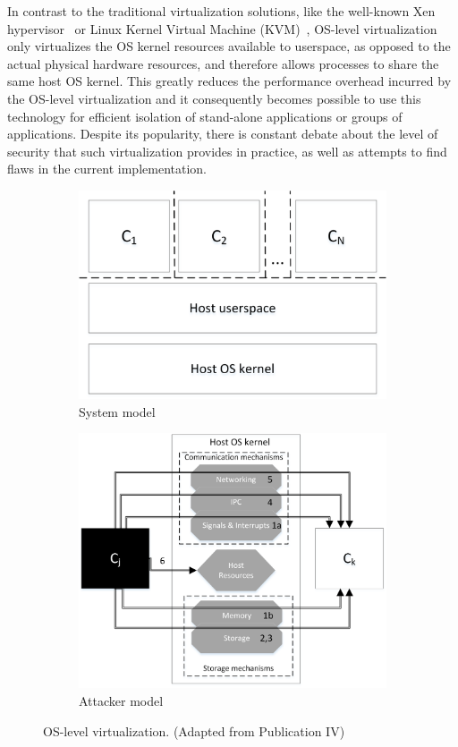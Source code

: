 In contrast to the traditional virtualization solutions, like the well-known Xen hypervisor~\cite{xenproject} or Linux Kernel Virtual Machine (KVM)~\cite{kvmproject}, OS-level virtualization only virtualizes the OS kernel resources available to userspace, as opposed to the actual physical hardware resources, and therefore allows processes to share the same host OS kernel. This greatly reduces the performance overhead incurred by the OS-level virtualization and it consequently becomes possible to use this technology for efficient isolation of stand-alone applications or groups of applications. Despite its popularity, there is constant debate about the level of security that such virtualization provides in practice, as well as attempts to find flaws in the current implementation. 


\begin{figure}[t]
\centering
\begin{subfigure}{.5\textwidth}
  \centering
  \includegraphics[width=0.8\linewidth]{figures/os-virtualization-sys-model.png}
  \caption{System model}
  \label{fig:osv-1}
\end{subfigure}%
\begin{subfigure}{.5\textwidth}
  \centering
  \includegraphics[width=1\linewidth]{figures/OS-virtualization-attacker-model.png}
  \caption{Attacker model}
  \label{fig:osv-2}
\end{subfigure}
\caption{OS-level virtualization. (Adapted from Publication IV)}
\label{fig:os-virtualization}
\end{figure}

